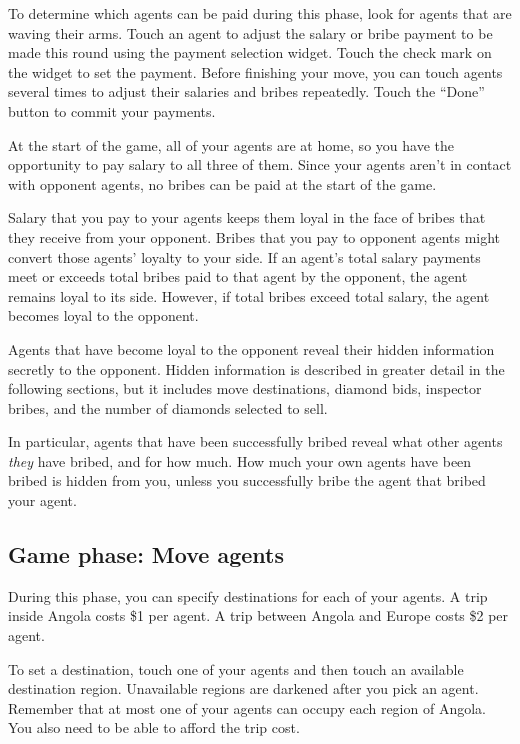 \documentclass[8pt]{extbook}
\begin{document}
To determine which agents can be paid during this phase, look for agents that are waving their arms.  Touch an agent to adjust the salary or bribe payment to be made this round using the payment selection widget.  Touch the check mark on the widget to set the payment.  Before finishing your move, you can touch agents several times to adjust their salaries and bribes repeatedly.  Touch the ``Done'' button to commit your payments. 

At the start of the game, all of your agents are at home, so you have the opportunity to pay salary to all three of them.  Since your agents aren't in contact with opponent agents, no bribes can be paid at the start of the game.

Salary that you pay to your agents keeps them loyal in the face of bribes that they receive from your opponent.  Bribes that you pay to opponent agents might convert those agents' loyalty to your side.  If an agent's total salary payments meet or exceeds total bribes paid to that agent by the opponent, the agent remains loyal to its side.  However, if total bribes exceed total salary, the agent becomes loyal to the opponent.

Agents that have become loyal to the opponent reveal their hidden information secretly to the opponent.  Hidden information is described in greater detail in the following sections, but it includes move destinations, diamond bids, inspector bribes, and the number of diamonds selected to sell.

In particular, agents that have been successfully bribed reveal what other agents {\it they} have bribed, and for how much.  How much your own agents have been bribed is hidden from you, unless you successfully bribe the agent that bribed your agent.

\subsection{Game phase:  Move agents}
\label{sec:movePhase}

During this phase, you can specify destinations for each of your agents.  A trip inside Angola costs \$1 per agent.  A trip between Angola and Europe costs \$2 per agent.

To set a destination, touch one of your agents and then touch an available destination region.  Unavailable regions are darkened after you pick an agent.  Remember that at most one of your agents can occupy each region of Angola.  You also need to be able to afford the trip cost.
\end{document}
